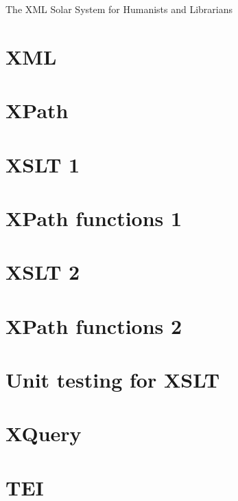 \documentclass[open=any, index=totoc, paper=167mm:239mm]{scrbook}
\begin{document}
  \frontmatter  
    \thispagestyle{empty}
    \vspace*{\fill}
    \begin{center}The XML Solar System for Humanists and Librarians\end{center}
    \vspace*{\fill}

    \tableofcontents

  \mainmatter
    \part{XML}
    

    \part{XPath}

    \part{XSLT 1}
    

    \part{XPath functions 1}

    \part{XSLT 2}

    \part{XPath functions 2}

    \part{Unit testing for XSLT}

    \part{XQuery}

    \part{TEI}
\end{document}
